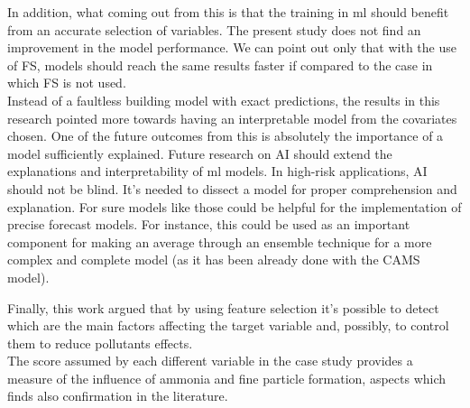 In addition, what coming out from this is that the training in \acrshort{ml} should benefit from an accurate selection of variables. 
The present study does not find an improvement in the model performance. We can point out only that with the use of FS, models should reach the same results faster if compared to the case in which FS is not used.\\
Instead of a faultless building model with exact predictions, the results in this research pointed more towards having an interpretable model from the covariates chosen. 
One of the future outcomes from this is absolutely the importance of a model sufficiently explained.
Future research on AI should extend the explanations and interpretability of \acrshort{ml} models.
In high-risk applications, AI should not be blind. 
It's needed to dissect a model for proper comprehension and explanation.
For sure models like those could be helpful for the implementation of precise forecast models.  
For instance, this could be used as an important component for making an average through an ensemble technique for a more complex and complete model (as it has been already done with the CAMS model).
\par
Finally, this work argued that by using feature selection it's possible to detect which are the main factors affecting the target variable and, possibly, to control them to reduce pollutants effects.\\
The score assumed by each different variable in the case study provides a measure of the influence of ammonia and fine particle formation, aspects which finds also confirmation in the literature.
\begin{comment}
Looking forward, further attempts for reducing pollutant formation should be made by procedures actually used.
\end{comment}


\begin{comment}
The present study confirmed the findings about the model performance which does not decrease if a feature selection is applied, in particular when we have to deal with a limited sample of data \cite{vabalas2019machine}. 
he more the training sample size is limited, the more an accurate selection of the most weighted variables is needed to increase its performance.
We can say that the feature selection application is necessary but not a sufficient condition to have an increment in the model performance.
\end{comment}